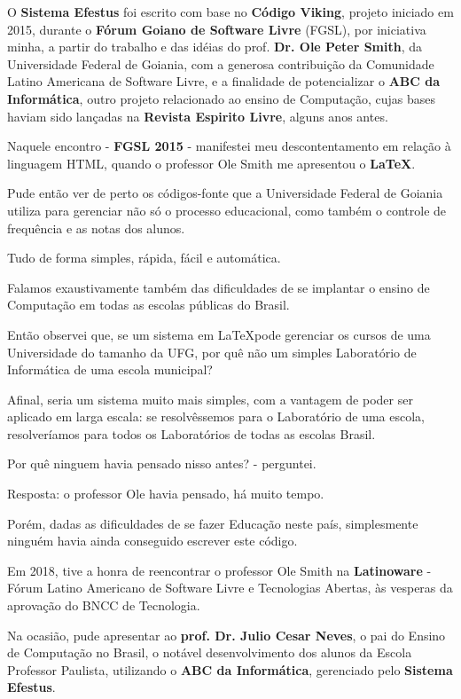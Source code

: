 \begin{multicols}{2}
{
\large
O \textbf{Sistema Efestus} foi escrito com base no \textbf{Código Viking}, projeto iniciado em 2015, durante o \textbf{Fórum \nobreak Goiano de Software Livre} (FGSL), por iniciativa minha, a partir do trabalho e das idéias do prof. \textbf{Dr. Ole Peter Smith}, da Universidade Federal de Goiania, com a generosa contribuição da Comunidade Latino Americana de Software Livre, e a finalidade de potencializar o \textbf{ABC da Informática}, outro projeto relacionado ao ensino de Computação, cujas bases haviam sido lançadas na \textbf{Revista Espirito Livre}, alguns anos antes.

Naquele encontro - \textbf{FGSL 2015} - manifestei meu descontentamento em relação à linguagem HTML, quando o professor Ole Smith me apresentou o \textbf{\LaTeX}.

Pude então ver de perto os códigos-fonte que a Universidade Federal de Goiania utiliza para gerenciar não só o processo educacional, como também o controle de frequência e as notas dos alunos.

Tudo de forma simples, rápida, fácil e automática.

Falamos exaustivamente também das dificuldades de se implantar o ensino de Computação em todas as escolas públicas do Brasil.

Então observei que, se um sistema em \LaTeX\space pode gerenciar os cursos de uma Universidade do tamanho da UFG, por quê não um simples Laboratório de Informática de uma escola municipal? 

Afinal, seria um sistema muito mais simples, com a vantagem de poder ser aplicado em larga escala: se resolvêssemos para o Laboratório de uma escola, resolveríamos para todos os Laboratórios de todas as escolas Brasil.

Por quê ninguem havia pensado nisso antes? - perguntei.

Resposta: o professor Ole havia pensado, há muito tempo.

Porém, dadas as dificuldades de se fazer Educação neste país, simplesmente ninguém havia ainda conseguido escrever este código.

Em 2018, tive a honra de reencontrar o professor Ole Smith na \textbf{Latinoware} - Fórum Latino Americano de Software Livre e Tecnologias Abertas, às vesperas da aprovação do BNCC de Tecnologia.

Na ocasião, pude apresentar ao \textbf{prof. Dr. Julio Cesar Neves}, o pai do Ensino de Computação no Brasil, o notável desenvolvimento dos alunos da Escola Professor Paulista, utilizando o \textbf{ABC da Informática}, gerenciado pelo \textbf{Sistema Efestus}.

}
\end{multicols}
